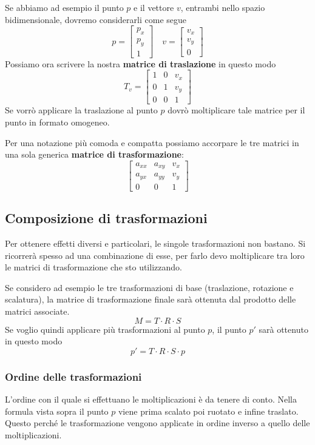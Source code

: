 Se abbiamo ad esempio il punto $p$ e il vettore $v$, entrambi nello spazio bidimensionale,
dovremo considerarli come segue
\[
	p = \begin{bmatrix}
		p_x \\ p_y \\ 1
	\end{bmatrix} \quad
	v = \begin{bmatrix}
		v_x \\ v_y \\ 0
	\end{bmatrix}
\]
Possiamo ora scrivere la nostra \textbf{matrice di traslazione} in questo modo
\[
	T_v = \begin{bmatrix}
		1 & 0 & v_x \\
		0 & 1 & v_y \\
		0 & 0 & 1
	\end{bmatrix}
\]
Se vorr\`o applicare la traslazione al punto $p$ dovr\`o moltiplicare tale matrice per il punto
in formato omogeneo.

Per una notazione pi\`u comoda e compatta possiamo accorpare le tre matrici in una sola generica
\textbf{matrice di trasformazione}:
\[
	\begin{bmatrix}
		a_{xx} & a_{xy} & v_x \\
		a_{yx} & a_{yy} & v_y \\
		0      & 0      & 1
	\end{bmatrix}
\]

\subsection{Composizione di trasformazioni}
Per ottenere effetti diversi e particolari, le singole trasformazioni non bastano. Si ricorrer\`a
spesso ad una combinazione di esse, per farlo devo moltiplicare tra loro le matrici di
trasformazione che sto utilizzando.

Se considero ad esempio le tre trasformazioni di base (traslazione, rotazione e scalatura), la
matrice di trasformazione finale sar\`a ottenuta dal prodotto delle matrici associate.
\[ M = T \cdot R \cdot S \]
Se voglio quindi applicare pi\`u trasformazioni al punto $p$, il punto $p'$ sar\`a ottenuto in
questo modo
\[ p' = T \cdot R \cdot S \cdot p \]

\subsubsection{Ordine delle trasformazioni}
L'ordine con il quale si effettuano le moltiplicazioni \`e da tenere di conto. Nella formula vista sopra il punto
$p$ viene prima scalato poi ruotato e infine traslato. Questo perch\'e le trasformazione vengono applicate in ordine
inverso a quello delle moltiplicazioni.

